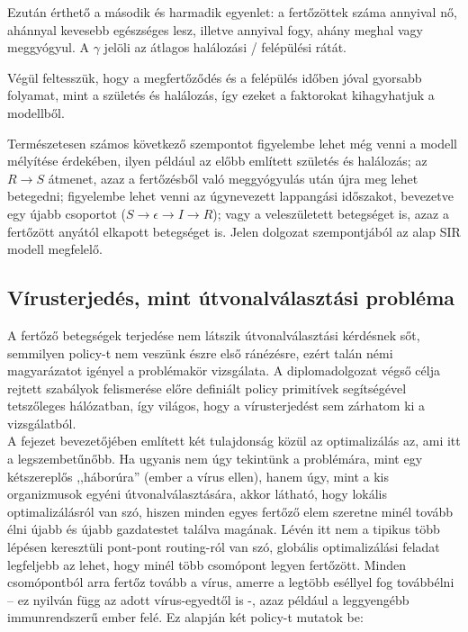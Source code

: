     Ezután érthető a második és harmadik egyenlet: a fertőzöttek száma annyival nő, ahánnyal kevesebb egészséges lesz, illetve annyival fogy, ahány meghal vagy meggyógyul. A $\gamma$ jelöli az átlagos halálozási / felépülési rátát.

    Végül feltesszük, hogy a megfertőződés és a felépülés időben jóval gyorsabb folyamat, mint a születés és halálozás, így ezeket a faktorokat kihagyhatjuk a modellből.

    \begin{note}
      Természetesen számos következő szempontot figyelembe lehet még venni a modell mélyítése érdekében, ilyen például az előbb említett születés és halálozás; az $R \rightarrow S$ átmenet, azaz a fertőzésből való meggyógyulás után újra meg lehet betegedni; figyelembe lehet venni az úgynevezett lappangási időszakot, bevezetve egy újabb csoportot ($S \rightarrow \epsilon \rightarrow I \rightarrow R$); vagy a veleszületett betegséget is, azaz a fertőzött anyától elkapott betegséget is.\newline
      Jelen dolgozat szempontjából az alap SIR modell megfelelő.
    \end{note}

    \subsection{Vírusterjedés, mint útvonalválasztási probléma}

    A fertőző betegségek terjedése nem látszik útvonalválasztási kérdésnek sőt, semmilyen policy-t nem veszünk észre első ránézésre, ezért talán némi magyarázatot igényel a problémakör vizsgálata. A diplomadolgozat végső célja rejtett szabályok felismerése előre definiált policy primitívek segítségével tetszőleges hálózatban, így világos, hogy a vírusterjedést sem zárhatom ki a vizsgálatból.\\

    A fejezet bevezetőjében említett két tulajdonság közül az optimalizálás az, ami itt a legszembetűnőbb. Ha ugyanis nem úgy tekintünk a problémára, mint egy kétszereplős ,,háborúra'' (ember a vírus ellen), hanem úgy, mint a kis organizmusok egyéni útvonalválasztására, akkor látható, hogy lokális optimalizálásról van szó, hiszen minden egyes fertőző elem szeretne minél tovább élni újabb és újabb gazdatestet találva magának. Lévén itt nem a tipikus több lépésen keresztüli pont-pont routing-ról van szó, globális optimalizálási feladat legfeljebb az lehet, hogy minél több csomópont legyen fertőzött. Minden csomópontból arra fertőz tovább a vírus, amerre a legtöbb eséllyel fog továbbélni -- ez nyilván függ az adott vírus-egyedtől is -, azaz például a leggyengébb immunrendszerű ember felé. Ez alapján két policy-t mutatok be:

